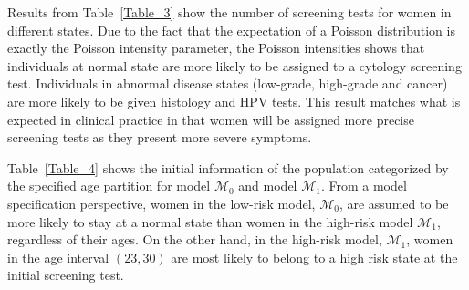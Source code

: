 \documentclass{article}
\begin{document}
Results from Table~\ref{Table_3} show the number of screening tests for women in different states. Due to the fact that the expectation of a Poisson distribution is exactly the Poisson intensity parameter, the Poisson intensities shows that individuals at normal state are more likely to be assigned to a cytology screening test. Individuals in abnormal disease states (low-grade, high-grade and cancer) are more likely to be given histology and HPV tests. This result matches what is expected in clinical practice in that women will be assigned more precise screening tests as they present more severe symptoms.

\begin{table}[ht!]
	\centering
	\caption{Maximum likelihood estimates of Poisson intensities for the number of tests conditioned on true state.}
	\label{Table_3}
\end{table}

Table~\ref{Table_4} shows the initial information of the population categorized by the specified age partition for model $\mathcal{M}_0$ and model $\mathcal{M}_1$. From a model specification perspective, women in the low-risk model, $\mathcal{M}_0$, are assumed to be more likely to stay at a normal state than women in the high-risk model $\mathcal{M}_1$, regardless of their ages. On the other hand, in the high-risk model, $\mathcal{M}_1$, women in the age interval $(23, 30)$ are most likely to belong to a high risk state at the initial screening test. 
\end{document}
